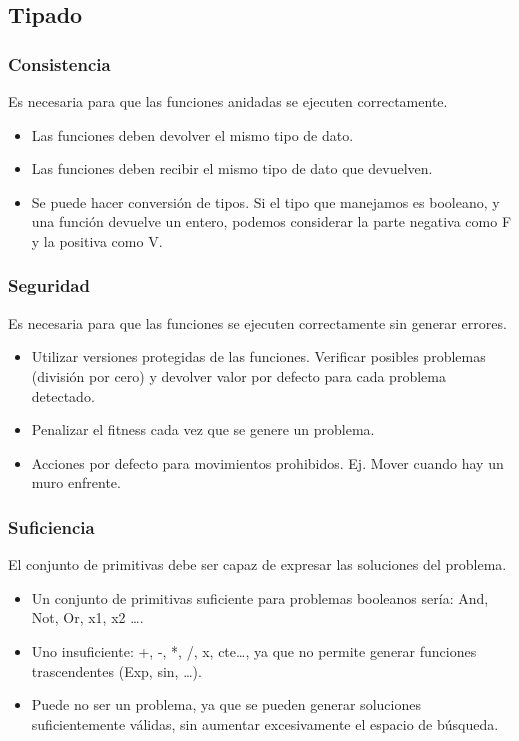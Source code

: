 \documentclass[12pt, twoside, openright]{report} %
\begin{document}
\subsection{Tipado}
\subsubsection{Consistencia}
Es necesaria para que las funciones anidadas se ejecuten correctamente.
\begin{itemize}
    \item Las funciones deben devolver el mismo tipo de dato.
    \item Las funciones deben recibir el mismo tipo de dato que devuelven.
    \item Se puede hacer conversión de tipos. Si el tipo que manejamos es booleano, y una función devuelve un entero, podemos considerar la parte negativa como F y la positiva como V.
\end{itemize}
\pagebreak
\subsubsection{Seguridad}
Es necesaria para que las funciones se ejecuten correctamente sin generar errores.
\begin{itemize}
    \item Utilizar versiones protegidas de las funciones. Verificar posibles problemas (división por cero) y devolver valor por defecto para cada problema detectado.
    \item Penalizar el fitness cada vez que se genere un problema.
    \item Acciones por defecto para movimientos prohibidos. Ej. Mover cuando hay un muro enfrente.
\end{itemize}
\subsubsection{Suficiencia}
El conjunto de primitivas debe ser capaz de expresar las soluciones del problema.
\begin{itemize}
    \item Un conjunto de primitivas suficiente para problemas booleanos sería: {And, Not, Or, x1, x2 …}.
    \item Uno insuficiente: {+, -, *, /, x, cte…}, ya que no permite generar funciones trascendentes (Exp, sin, …).
    \item Puede no ser un problema, ya que se pueden generar soluciones suficientemente válidas, sin aumentar excesivamente el espacio de búsqueda.
\end{itemize}
\end{document}
